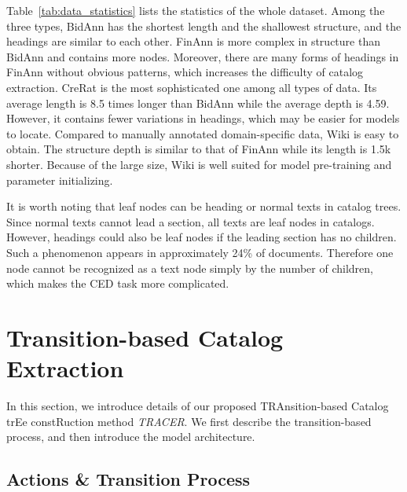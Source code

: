\documentclass[runningheads]{llncs}
\begin{document}
Table~\ref{tab:data_statistics} lists the statistics of the whole dataset.
Among the three types, BidAnn has the shortest length and the shallowest structure, and the headings are similar to each other.
FinAnn is more complex in structure than BidAnn and contains more nodes.
Moreover, there are many forms of headings in FinAnn without obvious patterns, which increases the difficulty of catalog extraction.
CreRat is the most sophisticated one among all types of data.
Its average length is 8.5 times longer than BidAnn while the average depth is 4.59.
However, it contains fewer variations in headings, which may be easier for models to locate.
Compared to manually annotated domain-specific data, Wiki is easy to obtain.
The structure depth is similar to that of FinAnn while its length is 1.5k shorter.
Because of the large size, Wiki is well suited for model pre-training and parameter initializing.

It is worth noting that leaf nodes can be heading or normal texts in catalog trees.
Since normal texts cannot lead a section, all texts are leaf nodes in catalogs.
However, headings could also be leaf nodes if the leading section has no children.
Such a phenomenon appears in approximately 24\% of documents.
Therefore one node cannot be recognized as a text node simply by the number of children, which makes the CED task more complicated.

 \section{Transition-based Catalog Extraction}

In this section, we introduce details of our proposed TRAnsition-based Catalog trEe constRuction method \textit{TRACER}.
We first describe the transition-based process, and then introduce the model architecture.

\subsection{Actions \& Transition Process}\label{sec:transition_process}
\end{document}

